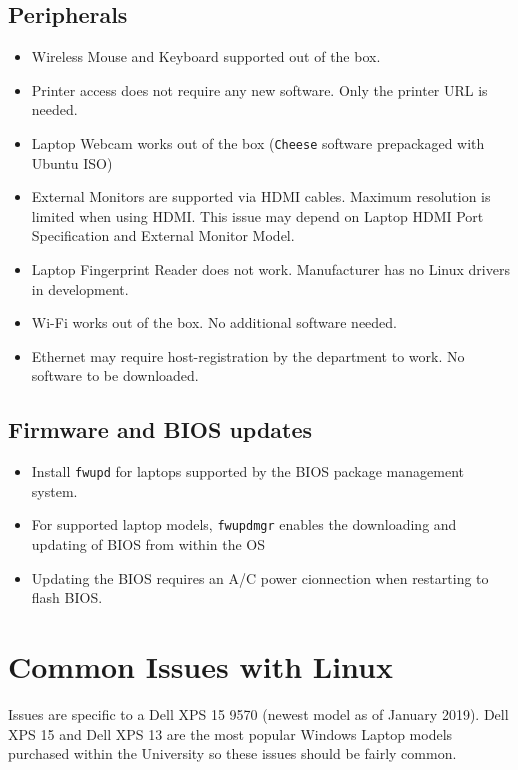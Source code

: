 \documentclass[8pt,letterpaper,twocolumn]{article}
\begin{document}
\subsection{Peripherals}

\begin{itemize}
	\item Wireless Mouse and Keyboard supported out of the box.
	\item Printer access does not require any new software. Only the printer URL is needed.
	\item Laptop Webcam works out of the box (\texttt{Cheese} software prepackaged with Ubuntu ISO)
	\item External Monitors are supported via HDMI cables. Maximum resolution is limited when using HDMI. This issue may depend on Laptop HDMI Port Specification and External Monitor Model.
	\item Laptop Fingerprint Reader does not work. Manufacturer has no Linux drivers in development.
	\item Wi-Fi works out of the box. No additional software needed.
	\item Ethernet may require host-registration by the department to work. No software to be downloaded.
\end{itemize}

\subsection{Firmware and BIOS updates}

\begin{itemize}
	\item Install \texttt{fwupd} for laptops supported by the BIOS package management system.
	\item For supported laptop models, \texttt{fwupdmgr} enables the downloading and updating of BIOS from within the OS
	\item Updating the BIOS requires an A/C power cionnection when restarting to flash BIOS.
\end{itemize}

\section{Common Issues with Linux}

Issues are specific to a Dell XPS 15 9570 (newest model as of January 2019). Dell XPS 15 and Dell XPS 13 are the most popular Windows Laptop models purchased within the University so these issues should be fairly common. \\
\end{document}
